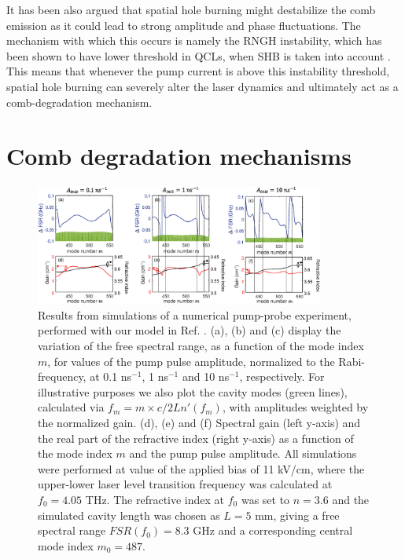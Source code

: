 \documentclass[journal]{IEEEtran}
\begin{document}
	It has been also argued that spatial hole burning might destabilize the comb emission as it could lead to strong amplitude and phase fluctuations. The mechanism with which this occurs is namely the RNGH instability, which has been shown to have lower threshold in QCLs, when SHB is taken into account \cite{gordon2008multimode}. This means that whenever the pump current is above this instability threshold, spatial hole burning can severely alter the laser dynamics and ultimately act as a comb-degradation mechanism.
	
	\section{Comb degradation mechanisms}
	\label{sec:combdegradation}
	
	\begin{figure}[h!]
		\centering
		\includegraphics[width=0.85\textwidth]{IMGS/FSR_variation}
		\caption{Results from simulations of a numerical pump-probe experiment, performed with our model in Ref. \cite{petz2016}. (a), (b) and (c) display the variation of the free spectral range, as a function of the mode index $m$, for values of the pump  pulse amplitude, normalized to the Rabi-frequency, at 0.1 ns$^{-1}$, 1 ns$^{-1}$ and 10 ns$^{-1}$, respectively. For illustrative purposes we also plot the cavity modes (green lines), calculated via $f_m = m\times c/2Ln'(f_m)$, with amplitudes weighted by the normalized gain. (d), (e) and (f) Spectral gain (left y-axis) and the real part of the refractive index (right y-axis) as a function of the mode index $m$ and the pump pulse amplitude. All simulations were performed at value of the applied bias of 11 kV/cm, where the upper-lower laser level transition frequency was calculated at $f_0 = 4.05$ THz. The refractive index at $f_0$ was set to $n=3.6$ and the simulated cavity length was chosen as $L=5$ mm, giving a free spectral range $FSR(f_0) = 8.3$ GHz and a corresponding central mode index $m_0 = 487$.}	\label{fig:dispersion}
	\end{figure}
	
\end{document}
